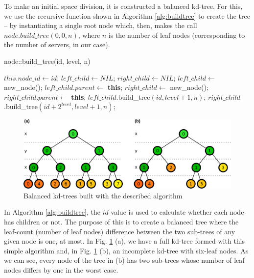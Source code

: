 \documentclass[acmjacm]{acmtrans2m}
\newcommand{\figurecaption}{Fig.}
\begin{document}
To make an initial space division, it is constructed a balanced kd-tree. For this, we use the recursive function shown in Algorithm \ref{alg:buildtree} to create the tree -- by instantiating a single root node which, then, makes the call $node.build\_tree(0,0,n)$, where $n$ is the number of leaf nodes (corresponding to the number of servers, in our case).

\begin{algorithm}
\caption{node::build\_tree(id, level, n)}
\label{alg:buildtree}
\begin{algorithmic}
 \STATE $this.node\_id \leftarrow id$;
		\STATE $left\_child \leftarrow NIL$;
		\STATE $right\_child \leftarrow NIL$;
	\ELSE
		\STATE $left\_child \leftarrow$ new\_node();
		\STATE $left\_child.parent \leftarrow$ \textbf{this};
		\STATE $right\_child \leftarrow$ new\_node();
		\STATE $right\_child.parent \leftarrow$ \textbf{this};
		\STATE $left\_child$.build\_tree$(id, level + 1, n)$;
		\STATE $right\_child$.build\_tree$(id + 2^{level}, level + 1, n)$;
	\ENDIF
\end{algorithmic}
\end{algorithm}

\begin{figure}[!t]
	\centering
	\includegraphics[width=\linewidth]{images/kdtree}
	\caption{Balanced kd-trees built with the described algorithm}
	\label{fig:kdtree}
\end{figure}

In Algorithm \ref{alg:buildtree}, the $id$ value is used to calculate whether each node has children or not. The purpose of this is to create a balanced tree where the leaf-count (number of leaf nodes) difference between the two sub-trees of any given node is one, at most. In \figurecaption{} \ref{fig:kdtree} (a), we have a full kd-tree formed with this simple algorithm and, in \figurecaption{} \ref{fig:kdtree} (b), an incomplete kd-tree with six-leaf nodes. As we can see, every node of the tree in (b) has two sub-trees whose number of leaf nodes differs by one in the worst case.
\end{document}
